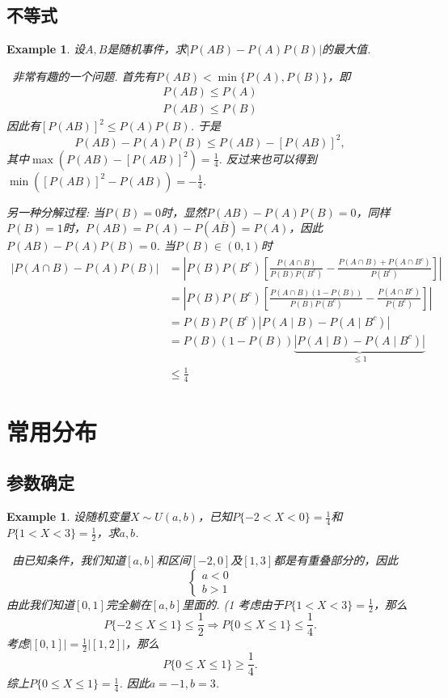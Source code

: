 \documentclass{article}
\newtheorem{example}[theorem]{Example}
\newcommand{\hints}{{\color{blue} \text{hints}}}
\begin{document}
\subsection{不等式}
\begin{example}
\rm 设$A,B$是随机事件，求$|P(AB)-P(A)P(B)|$的最大值. 

\hints\ 非常有趣的一个问题. 首先有$P(AB) < \min\{P(A),P(B)\}$，即
$$
\begin{aligned}
P(AB) \leq P(A) \\ 
P(AB) \leq P(B)
\end{aligned}
$$
因此有$[P(AB)]^2 \leq P(A)P(B)$. 于是
$$
P(AB)-P(A)P(B) \leq P(AB) - [P(AB)]^2,
$$
其中$\max(P(AB) - [P(AB)]^2) = \frac{1}{4}$. 反过来也可以得到$\min([P(AB)]^2 -P(AB)) = -\frac{1}{4}$. 

另一种分解过程: 当$P(B) = 0$时，显然$P(AB) - P(A)P(B)=0$，同样$P(B) = 1$时，$P(AB) = P(A)-P(A\overline{B}) = P(A)$，因此$P(AB) - P(A)P(B)=0$. 当$P(B) \in (0,1)$时
\begin{align}|P(A\cap B)-P(A)P(B)|
&= \left|P(B)P(B^c)\left[ \frac{P(A\cap B)}{P(B)P(B^c)} - \frac{P(A\cap B)+P(A\cap B^c)}{P(B^c)} \right]\right|\\ 
&= \left|P(B)P(B^c)\left[\frac{P(A\cap B)(1-P(B))}{P(B)P(B^c)}-\frac{P(A\cap B^c)}{P(B^c)} \right]\right|\\
&=P(B)P(B^c)|P(A\mid B)-P(A\mid B^c)|\\
&=P(B)(1-P(B))\underbrace{|P(A\mid B)-P(A\mid B^c)|}_{\leq 1}\\
&\leq \frac 14
\end{align}
\end{example}

\newpage
\section{常用分布}

\subsection{参数确定}

\begin{example}
\rm 设随机变量$X \sim U(a,b)$，已知$P\{-2< X < 0\} = \frac{1}{4}$和$P\{1<X<3\} = \frac{1}{2}$，求$a,b$. 

\hints\ 由已知条件，我们知道$[a,b]$和区间$[-2,0]$及$[1,3]$都是有重叠部分的，因此
$$
\left\{
\begin{array}{ll}
a < 0 \\
b > 1  
\end{array} \right.
$$ 
由此我们知道$[0,1]$完全躺在$[a,b]$里面的. (1 考虑由于$P\{1< X < 3\} =\frac{1}{2}$，那么
$$
P\{-2 \leq X \leq 1\} \leq \frac{1}{2}  \Rightarrow  P\{0 \leq X \leq 1\} \leq \frac{1}{4}.
$$
考虑$|[0,1]| = \frac{1}{2}|[1,2]|$，那么
$$
P\{0 \leq X \leq 1\} \geq \frac{1}{4}. 
$$
综上$P\{0 \leq X \leq 1 \} = \frac{1}{4}$. 因此$a = -1, b=3$. 
\end{example}
\end{document}

